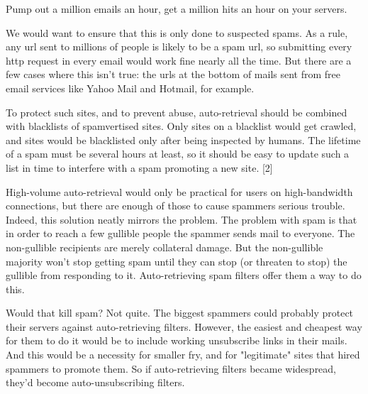 Pump out a
                  million emails an hour, get a million hits an hour on your
                  servers.


                  We would want to ensure that this is only done to suspected
                  spams. As a rule, any url sent to millions of people is likely
                  to be a spam url, so submitting every http request in every
                  email would work fine nearly all the time. But there are a few
                  cases where this isn't true: the urls at the bottom of mails
                  sent from free email services like Yahoo Mail and Hotmail, for
                  example.

To protect such sites, and to prevent
                  abuse, auto-retrieval should be combined with blacklists of
                  spamvertised sites. Only sites on a blacklist would get
                  crawled, and sites would be blacklisted only after being
                  inspected by humans. The lifetime of a spam must be several
                  hours at least, so it should be easy to update such a list in
                  time to interfere with a spam promoting a new site. [2]

High-volume
                  auto-retrieval would only be practical for users on
                  high-bandwidth connections, but there are enough of those to
                  cause spammers serious trouble. Indeed, this solution neatly
                  mirrors the problem. The problem with spam is that in order to
                  reach a few gullible people the spammer sends mail to
                  everyone. The non-gullible recipients are merely collateral
                  damage. But the non-gullible majority won't stop getting spam
                  until they can stop (or threaten to stop) the gullible from
                  responding to it. Auto-retrieving spam filters offer them a
                  way to do this.

Would that kill spam? Not quite.
                  The biggest spammers could probably protect their servers
                  against auto-retrieving filters. However, the easiest and
                  cheapest way for them to do it would be to include working
                  unsubscribe links in their mails. And this would be a
                  necessity for smaller fry, and for "legitimate" sites that
                  hired spammers to promote them. So if auto-retrieving filters
                  became widespread, they'd become auto-unsubscribing
                  filters.


